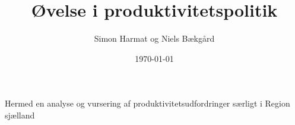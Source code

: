 \documentclass[a4paper, 12pt]{article}
\author{Simon Harmat og Niels Bækgård}
\title{Øvelse i produktivitetspolitik}
\date{\today}
\begin{document}
Hermed en analyse og vursering af produktivitetsudfordringer særligt i Region sjælland
\end{document}
